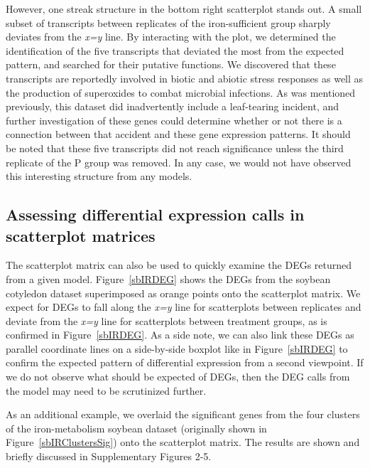 \documentclass{bioinfo}
\begin{document}
However, one streak structure in the bottom right scatterplot stands out. A small subset of transcripts between replicates of the iron-sufficient group sharply deviates from the \textit{x=y} line. By interacting with the plot, we determined the identification of the five transcripts that deviated the most from the expected pattern, and searched for their putative functions. We discovered that these transcripts are reportedly involved in biotic and abiotic stress responses as well as the production of superoxides to combat microbial infections. As was mentioned previously, this dataset did inadvertently include a leaf-tearing incident, and further investigation of these genes could determine whether or not there is a connection between that accident and these gene expression patterns. It should be noted that these five transcripts did not reach significance unless the third replicate of the P group was removed. In any case, we would not have observed this interesting structure from any models.

\subsection{Assessing differential expression calls in scatterplot matrices}

The scatterplot matrix can also be used to quickly examine the DEGs returned from a given model. Figure~\ref{sbIRDEG} shows the DEGs from the soybean cotyledon dataset superimposed as orange points onto the scatterplot matrix. We expect for DEGs to fall along the \textit{x=y} line for scatterplots between replicates and deviate from the \textit{x=y} line for scatterplots between treatment groups, as is confirmed in Figure~\ref{sbIRDEG}. As a side note, we can also link these DEGs as parallel coordinate lines on a side-by-side boxplot like in Figure~\ref{sbIRDEG} to confirm the expected pattern of differential expression from a second viewpoint. If we do not observe what should be expected of DEGs, then the DEG calls from the model may need to be scrutinized further.

As an additional example, we overlaid the significant genes from the four clusters of the iron-metabolism soybean dataset (originally shown in Figure~\ref{sbIRClustersSig}) onto the scatterplot matrix. The results are shown and briefly discussed in Supplementary Figures 2-5. 
\end{document}
